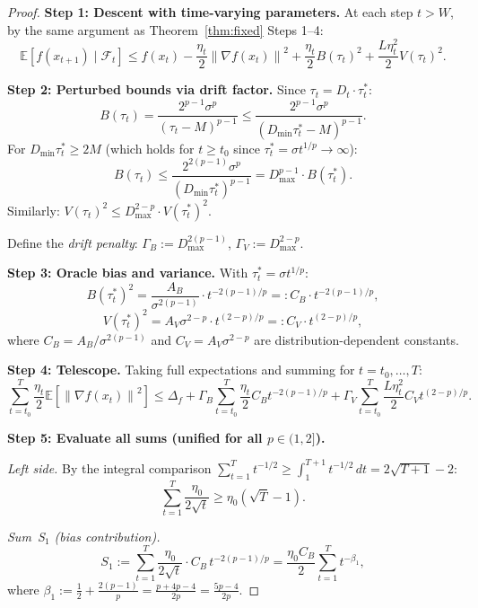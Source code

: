 \documentclass[11pt]{article}
\theoremstyle{definition}
\newcommand{\E}{\mathbb{E}}
\newcommand{\norm}[1]{\left\| #1 \right\|}
\newcommand{\Filt}{\mathcal{F}}
\begin{document}
\begin{proof}
\textbf{Step 1: Descent with time-varying parameters.}
At each step $t > W$, by the same argument as Theorem~\ref{thm:fixed} Steps 1--4:
\[
  \E[f(x_{t+1}) \mid \Filt_t]
  \leq f(x_t) - \frac{\eta_t}{2}\norm{\nabla f(x_t)}^2
    + \frac{\eta_t}{2}B(\tau_t)^2
    + \frac{L\eta_t^2}{2}V(\tau_t)^2.
\]

\textbf{Step 2: Perturbed bounds via drift factor.}
Since $\tau_t = D_t \cdot \tau_t^*$:
\[
  B(\tau_t) = \frac{2^{p-1}\sigma^p}{(\tau_t - M)^{p-1}}
  \leq \frac{2^{p-1}\sigma^p}{(D_{\min}\tau_t^* - M)^{p-1}}.
\]
For $D_{\min}\tau_t^* \geq 2M$ (which holds for $t \geq t_0$ since
$\tau_t^* = \sigma t^{1/p} \to \infty$):
\[
  B(\tau_t) \leq \frac{2^{2(p-1)}\sigma^p}{(D_{\min}\tau_t^*)^{p-1}}
  = D_{\max}^{p-1} \cdot B(\tau_t^*).
\]
Similarly: $V(\tau_t)^2 \leq D_{\max}^{2-p} \cdot V(\tau_t^*)^2$.

Define the \emph{drift penalty}:
$\Gamma_B := D_{\max}^{2(p-1)}$,\; $\Gamma_V := D_{\max}^{2-p}$.

\textbf{Step 3: Oracle bias and variance.}
With $\tau_t^* = \sigma t^{1/p}$:
\[
  B(\tau_t^*)^2 = \frac{A_B}{\sigma^{2(p-1)}} \cdot t^{-2(p-1)/p}
  =: C_B \cdot t^{-2(p-1)/p},
\]
\[
  V(\tau_t^*)^2 = A_V \sigma^{2-p} \cdot t^{(2-p)/p}
  =: C_V \cdot t^{(2-p)/p},
\]
where $C_B = A_B/\sigma^{2(p-1)}$ and $C_V = A_V\sigma^{2-p}$ are
distribution-dependent constants.

\textbf{Step 4: Telescope.}
Taking full expectations and summing for $t = t_0, \ldots, T$:
\begin{equation}\label{eq:growing_tele}
  \sum_{t=t_0}^T \frac{\eta_t}{2}\E[\norm{\nabla f(x_t)}^2]
  \leq \Delta_f
    + \Gamma_B \sum_{t=t_0}^T \frac{\eta_t}{2} C_B t^{-2(p-1)/p}
    + \Gamma_V \sum_{t=t_0}^T \frac{L\eta_t^2}{2} C_V t^{(2-p)/p}.
\end{equation}

\textbf{Step 5: Evaluate all sums (unified for all $p \in (1,2]$).}

\emph{Left side.}
By the integral comparison $\sum_{t=1}^T t^{-1/2} \geq \int_1^{T+1} t^{-1/2}\,dt
= 2\sqrt{T+1} - 2$:
\begin{equation}\label{eq:left_sum}
  \sum_{t=1}^T \frac{\eta_0}{2\sqrt{t}} \geq \eta_0(\sqrt{T} - 1).
\end{equation}

\emph{Sum~S$_1$ (bias contribution).}
\[
  S_1 := \sum_{t=1}^T \frac{\eta_0}{2\sqrt{t}} \cdot C_B\, t^{-2(p-1)/p}
  = \frac{\eta_0 C_B}{2} \sum_{t=1}^T t^{-\beta_1},
\]
where $\beta_1 := \frac{1}{2} + \frac{2(p-1)}{p} = \frac{p + 4p - 4}{2p}
= \frac{5p - 4}{2p}$.


\end{proof}
\end{document}
